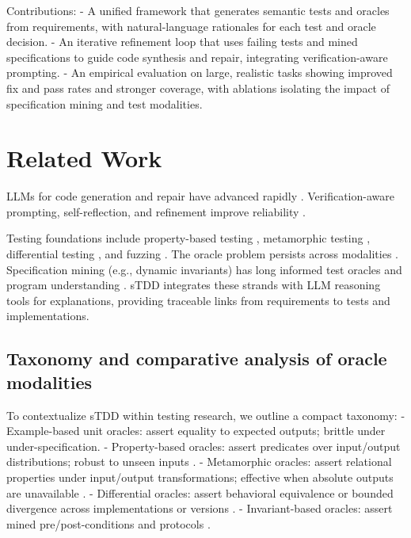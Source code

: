 \documentclass[10pt,twocolumn]{article}
\begin{document}
Contributions:
- A unified framework that generates semantic tests and oracles from requirements, with natural-language rationales for each test and oracle decision.
- An iterative refinement loop that uses failing tests and mined specifications to guide code synthesis and repair, integrating verification-aware prompting.
- An empirical evaluation on large, realistic tasks showing improved fix and pass rates and stronger coverage, with ablations isolating the impact of specification mining and test modalities.

\section{Related Work}
LLMs for code generation and repair have advanced rapidly \cite{Chen2021Codex,Roziere2023CodeLlama,Li2023StarCoder,OpenAI2023GPT4,Zhang2023SurveyLLM4Code}. Verification-aware prompting, self-reflection, and refinement improve reliability \cite{Shinn2023Reflexion,Madaan2023SelfRefine,Wang2023SelfConsistency,Wei2022CoT,Qiu2023Toolformer,Liu2024SWEAgent}. 

Testing foundations include property-based testing \cite{ClaessenHughes2000}, metamorphic testing \cite{Segura2016MetamorphicSurvey,Gao2020MetamorphicML}, differential testing \cite{Yang2011Csmith,Shen2019DifferentialSurvey}, and fuzzing \cite{Manes2019FuzzingSurvey}. The oracle problem persists across modalities \cite{Barr2015OracleSurvey}. Specification mining (e.g., dynamic invariants) has long informed test oracles and program understanding \cite{Ernst2007Daikon}. sTDD integrates these strands with LLM reasoning tools for explanations, providing traceable links from requirements to tests and implementations.

\subsection{Taxonomy and comparative analysis of oracle modalities}
To contextualize sTDD within testing research, we outline a compact taxonomy:
- Example-based unit oracles: assert equality to expected outputs; brittle under under-specification.
- Property-based oracles: assert predicates over input/output distributions; robust to unseen inputs \cite{ClaessenHughes2000}.
- Metamorphic oracles: assert relational properties under input/output transformations; effective when absolute outputs are unavailable \cite{Segura2016MetamorphicSurvey,Gao2020MetamorphicML}.
- Differential oracles: assert behavioral equivalence or bounded divergence across implementations or versions \cite{Yang2011Csmith,Shen2019DifferentialSurvey}.
- Invariant-based oracles: assert mined pre/post-conditions and protocols \cite{Ernst2007Daikon}.
\end{document}
